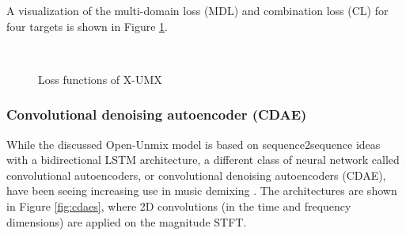 \documentclass[report.tex]{subfiles}
\begin{document}
A visualization of the multi-domain loss (MDL) and combination loss (CL) for four targets is shown in Figure \ref{fig:xumxlosses}.

\begin{figure}[ht]
	\centering
	\\
	\caption{Loss functions of X-UMX \parencite[2]{xumx}}
	\label{fig:xumxlosses}
\end{figure}

\subsubsection{Convolutional denoising autoencoder (CDAE)}
\label{sec:cdae}

While the discussed Open-Unmix model is based on sequence2sequence ideas with a bidirectional LSTM architecture, a different class of neural network called convolutional autoencoders, or convolutional denoising autoencoders (CDAE), have been seeing increasing use in music demixing \parencite{plumbley1, plumbley2}. The architectures are shown in Figure \ref{fig:cdaes}, where 2D convolutions (in the time and frequency dimensions) are applied on the magnitude STFT.
\end{document}
